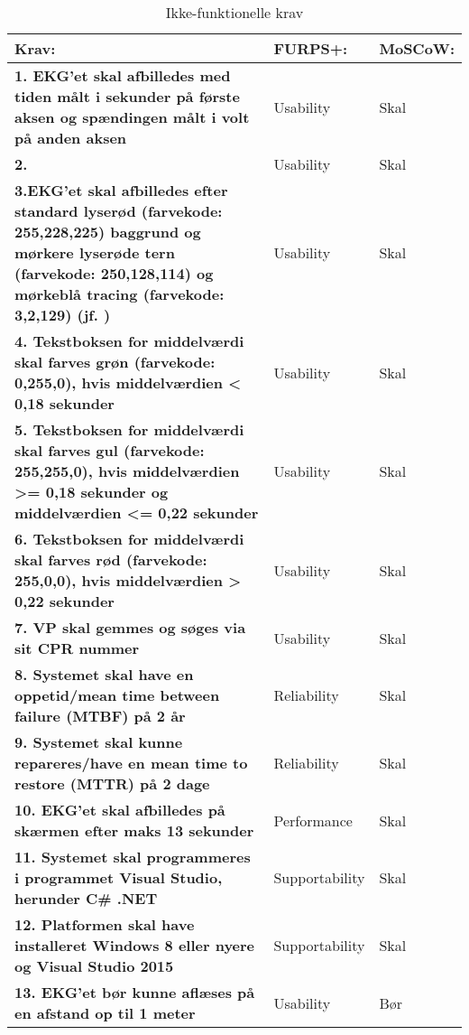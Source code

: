 \begin{table} [htbp]
\centering
\begin{tabular}{|p{10cm}|l|l|}
\hline
\textbf{Krav:} & \textbf{FURPS+:} & \textbf{MoSCoW:} \\ \hline
\textbf{1. EKG'et skal afbilledes med tiden målt i sekunder på første aksen og spændingen målt i volt på anden aksen} & Usability & Skal \\ \hline
\textbf{2. } & Usability & Skal \\ \hline
\textbf{3.EKG'et skal afbilledes efter standard lyserød (farvekode: 255,228,225) baggrund og mørkere lyserøde tern (farvekode: 250,128,114) og mørkeblå tracing (farvekode: 3,2,129) (jf. \citep{guidetoECGanalysis})}  & Usability & Skal \\ \hline
\textbf{4. Tekstboksen for middelværdi skal farves grøn (farvekode: 0,255,0), hvis middelværdien < 0,18 sekunder} & Usability & Skal \\ \hline
\textbf{5. Tekstboksen for middelværdi skal farves gul (farvekode: 255,255,0), hvis middelværdien >= 0,18 sekunder og middelværdien <= 0,22 sekunder} & Usability & Skal \\ \hline
\textbf{6. Tekstboksen for middelværdi skal farves rød (farvekode: 255,0,0), hvis middelværdien > 0,22 sekunder } & Usability & Skal \\ \hline
\textbf{7. VP skal gemmes og søges via sit CPR nummer } & Usability & Skal \\ \hline
\textbf{8. Systemet skal have en oppetid/mean time between failure (MTBF) på 2 år} & Reliability & Skal \\ \hline
\textbf{9. Systemet skal kunne repareres/have en mean time to restore (MTTR) på 2 dage} & Reliability & Skal \\ \hline
\textbf{10. EKG'et skal afbilledes på skærmen efter maks 13 sekunder} & Performance & Skal \\ \hline
\textbf{11. Systemet skal programmeres i programmet Visual Studio, herunder C\# .NET} & Supportability & Skal \\ \hline
\textbf{12. Platformen skal have installeret Windows 8 eller nyere og Visual Studio 2015} & Supportability & Skal \\ \hline
\textbf{13. EKG'et bør kunne aflæses på en afstand op til 1 meter} & Usability & Bør \\ \hline
\end{tabular}
\caption{Ikke-funktionelle krav}
\label{tb:ikkefunkkrav} 
\end{table}

